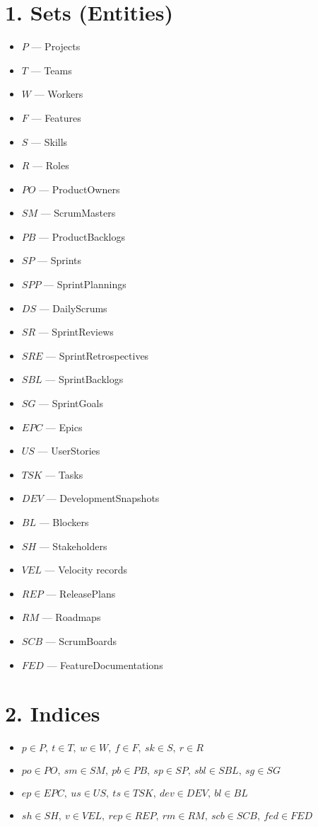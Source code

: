\documentclass[11pt]{article}
\begin{document}
\section{1. Sets (Entities)}
\begin{itemize}[leftmargin=*,itemsep=2pt]
  \item $P$ --- Projects
  \item $T$ --- Teams
  \item $W$ --- Workers
  \item $F$ --- Features
  \item $S$ --- Skills
  \item $R$ --- Roles
  \item $PO$ --- ProductOwners
  \item $SM$ --- ScrumMasters
  \item $PB$ --- ProductBacklogs
  \item $SP$ --- Sprints
  \item $SPP$ --- SprintPlannings
  \item $DS$ --- DailyScrums
  \item $SR$ --- SprintReviews
  \item $SRE$ --- SprintRetrospectives
  \item $SBL$ --- SprintBacklogs
  \item $SG$ --- SprintGoals
  \item $EPC$ --- Epics
  \item $US$ --- UserStories
  \item $TSK$ --- Tasks
  \item $DEV$ --- DevelopmentSnapshots
  \item $BL$ --- Blockers
  \item $SH$ --- Stakeholders
  \item $VEL$ --- Velocity records
  \item $REP$ --- ReleasePlans
  \item $RM$ --- Roadmaps
  \item $SCB$ --- ScrumBoards
  \item $FED$ --- FeatureDocumentations
\end{itemize}

\section{2. Indices}
\begin{itemize}[leftmargin=*,itemsep=2pt]
  \item $p\in P,\ t\in T,\ w\in W,\ f\in F,\ sk\in S,\ r\in R$
  \item $po\in PO,\ sm\in SM,\ pb\in PB,\ sp\in SP,\ sbl\in SBL,\ sg\in SG$
  \item $ep\in EPC,\ us\in US,\ ts\in TSK,\ dev\in DEV,\ bl\in BL$
  \item $sh\in SH,\ v\in VEL,\ rep\in REP,\ rm\in RM,\ scb\in SCB,\ fed\in FED$
\end{itemize}
\end{document}
